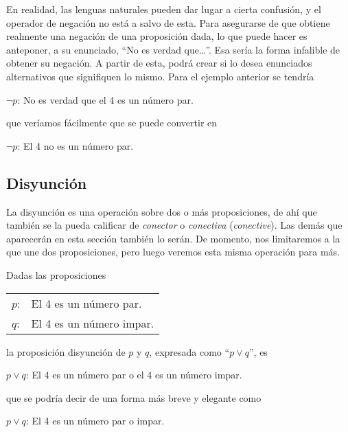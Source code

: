 En realidad, las lenguas naturales pueden dar lugar a cierta confusión, y el
operador de negación no está a salvo de esta. Para asegurarse de que obtiene
realmente una negación de una proposición dada, lo que puede hacer es
anteponer, a su enunciado, ``No es verdad que\ldots''. Esa sería la forma
infalible de obtener su negación. A partir de esta, podrá crear si lo desea
enunciados alternativos que signifiquen lo mismo. Para el ejemplo anterior
se tendría

\begin{center}
  $\neg p$: No es verdad que el 4 es un número par.
\end{center}

\noindent que veríamos fácilmente que se puede convertir en

\begin{center}
  $\neg p$: El 4 no es un número par.
\end{center}





\subsection{Disyunción}

La disyunción es una operación sobre dos o más proposiciones, de ahí que
también se la pueda calificar de \emph{conector} o \emph{conectiva}
(\emph{conective}). Las demás que aparecerán en esta sección también lo
serán. De momento, nos limitaremos a la que une dos proposiciones, pero
luego veremos esta misma operación para más.

Dadas las proposiciones

\begin{center}
\begin{tabular}{ll}
  $p$: & El 4 es un número par. \\
  $q$: & El 4 es un número impar.
\end{tabular}
\end{center}

\noindent la proposición disyunción de $p$ y $q$, expresada como ``\(p
\lor q\)'', es

\begin{center}
  $p \lor q$: El 4 es un número par o el 4 es un número impar.
\end{center}

\noindent que se podría decir de una forma más breve y elegante como

\begin{center}
  $p \lor q$: El 4 es un número par o impar.
\end{center}

